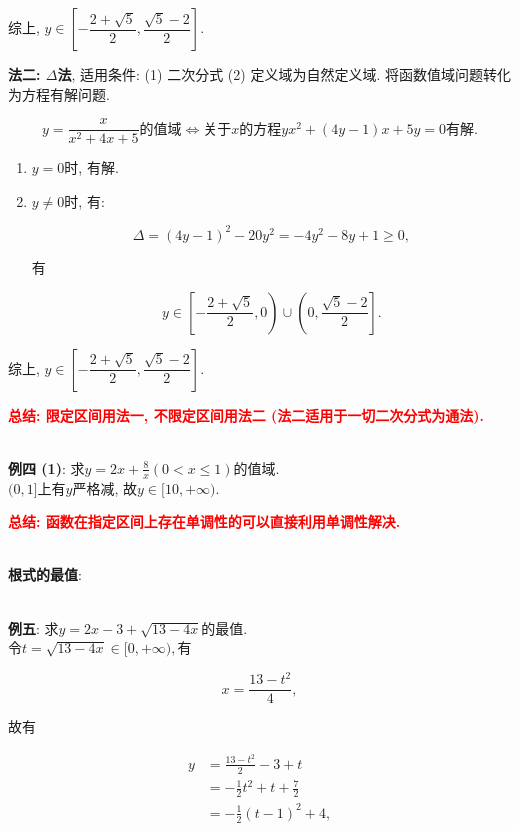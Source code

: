 \documentclass[8pt]{article}
\begin{document}
					综上, $y\in \left[-\dfrac{2+\sqrt{5}}{2}, \dfrac{\sqrt{5}-2}{2}\right]$.

					\textbf{法二: $\Delta$法}, 适用条件: (1) 二次分式 (2) 定义域为自然定义域. 将函数值域问题转化为方程有解问题.

					$$y=\frac{x}{x^2+4x+5}\text{的值域} \Leftrightarrow \text{关于}x\text{的方程}yx^2+(4y-1)x+5y=0\text{有解}.$$

					\begin{enumerate}[label=$\arabic*^{\circ}$]
						\item $y=0$时, 有解.
						\item $y\neq 0$时, 有:

							$$\Delta = (4y-1)^2-20y^2=-4y^2-8y+1\geq 0,$$

							有

							$$y\in\left[-\frac{2+\sqrt{5}}{2}, 0\right)\cup\left(0, \frac{\sqrt{5}-2}{2}\right].$$

					\end{enumerate}

					综上, $y\in \left[-\dfrac{2+\sqrt{5}}{2}, \dfrac{\sqrt{5}-2}{2}\right]$.

					\textbf{\textcolor{red}{总结: 限定区间用法一, 不限定区间用法二 (法二适用于一切二次分式为通法).}}

				~\\

				\textbf{例四 (1)}: 求$y=2x+\frac{8}{x} (0<x\leq 1)$的值域.
					~\\

					$(0, 1]$上有$y$严格减, 故$y\in[10, +\infty).$

					\textbf{\textcolor{red}{总结: 函数在指定区间上存在单调性的可以直接利用单调性解决.}}

				~\\

				\textbf{根式的最值}:

				~\\

				\textbf{例五}: 求$y=2x-3+\sqrt{13-4x}$的最值.
					~\\

					令$t=\sqrt{13-4x}\in[0, +\infty),$有

					$$x=\frac{13-t^2}{4},$$

					故有

					\begin{align*}
						y &= \frac{13-t^2}{2}-3+t\\
						  &= -\frac{1}{2} t^2 + t + \frac{7}{2}\\
						  &= -\frac{1}{2} (t-1)^2 + 4,\\
					\end{align*}
\end{document}
